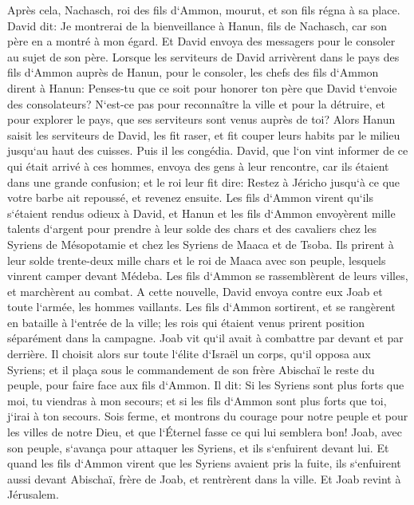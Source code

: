 \verse Après cela, Nachasch, roi des fils d`Ammon, mourut, et son fils régna à sa place. 
\verse David dit: Je montrerai de la bienveillance à Hanun, fils de Nachasch, car son père en a montré à mon égard. Et David envoya des messagers pour le consoler au sujet de son père. Lorsque les serviteurs de David arrivèrent dans le pays des fils d`Ammon auprès de Hanun, pour le consoler, 
\verse les chefs des fils d`Ammon dirent à Hanun: Penses-tu que ce soit pour honorer ton père que David t`envoie des consolateurs? N`est-ce pas pour reconnaître la ville et pour la détruire, et pour explorer le pays, que ses serviteurs sont venus auprès de toi? 
\verse Alors Hanun saisit les serviteurs de David, les fit raser, et fit couper leurs habits par le milieu jusqu`au haut des cuisses. Puis il les congédia. 
\verse David, que l`on vint informer de ce qui était arrivé à ces hommes, envoya des gens à leur rencontre, car ils étaient dans une grande confusion; et le roi leur fit dire: Restez à Jéricho jusqu`à ce que votre barbe ait repoussé, et revenez ensuite. 
\verse Les fils d`Ammon virent qu`ils s`étaient rendus odieux à David, et Hanun et les fils d`Ammon envoyèrent mille talents d`argent pour prendre à leur solde des chars et des cavaliers chez les Syriens de Mésopotamie et chez les Syriens de Maaca et de Tsoba. 
\verse Ils prirent à leur solde trente-deux mille chars et le roi de Maaca avec son peuple, lesquels vinrent camper devant Médeba. Les fils d`Ammon se rassemblèrent de leurs villes, et marchèrent au combat. 
\verse A cette nouvelle, David envoya contre eux Joab et toute l`armée, les hommes vaillants. 
\verse Les fils d`Ammon sortirent, et se rangèrent en bataille à l`entrée de la ville; les rois qui étaient venus prirent position séparément dans la campagne. 
\verse Joab vit qu`il avait à combattre par devant et par derrière. Il choisit alors sur toute l`élite d`Israël un corps, qu`il opposa aux Syriens; 
\verse et il plaça sous le commandement de son frère Abischaï le reste du peuple, pour faire face aux fils d`Ammon. 
\verse Il dit: Si les Syriens sont plus forts que moi, tu viendras à mon secours; et si les fils d`Ammon sont plus forts que toi, j`irai à ton secours. 
\verse Sois ferme, et montrons du courage pour notre peuple et pour les villes de notre Dieu, et que l`Éternel fasse ce qui lui semblera bon! 
\verse Joab, avec son peuple, s`avança pour attaquer les Syriens, et ils s`enfuirent devant lui. 
\verse Et quand les fils d`Ammon virent que les Syriens avaient pris la fuite, ils s`enfuirent aussi devant Abischaï, frère de Joab, et rentrèrent dans la ville. Et Joab revint à Jérusalem. 
